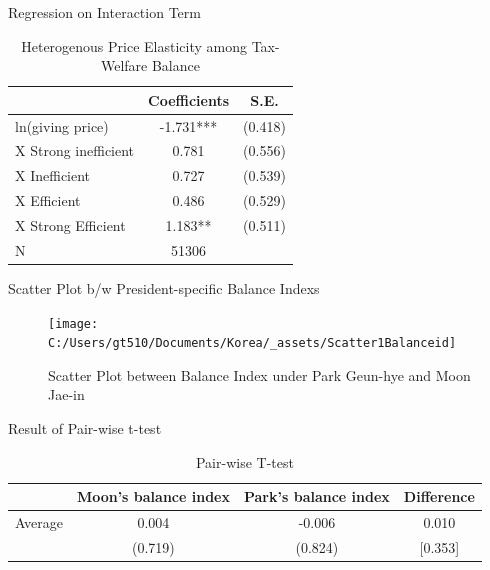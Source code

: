\documentclass[
  ignorenonframetext,
]{beamer}
\begin{document}
\begin{frame}{Regression on Interaction Term}
\protect\hypertarget{regression-on-interaction-term-1}{}

\begin{table}

\caption{\label{tab:kableEstimateInteractionByBalanceGroup}Heterogenous Price Elasticity among Tax-Welfare Balance}
\centering
\begin{tabular}[t]{lcc}
\toprule
 & Coefficients & S.E.\\
\midrule
ln(giving price) & -1.731*** & (0.418)\\
\hspace{1em}X Strong inefficient & 0.781 & (0.556)\\
\hspace{1em}X Inefficient & 0.727 & (0.539)\\
\hspace{1em}X Efficient & 0.486 & (0.529)\\
\hspace{1em}X Strong Efficient & 1.183** & (0.511)\\
N & 51306 & \\
\bottomrule
\end{tabular}
\end{table}

\end{frame}

\begin{frame}{Scatter Plot b/w President-specific Balance Indexs}
\protect\hypertarget{scatter-plot-bw-president-specific-balance-indexs}{}

\begin{figure}
\texttt{[image: C:/Users/gt510/Documents/Korea/\_assets/Scatter1Balanceid]} \caption{Scatter Plot between Balance Index under Park Geun-hye and Moon Jae-in}\label{fig:unnamed-chunk-11}
\end{figure}

\end{frame}

\begin{frame}{Result of Pair-wise t-test}
\protect\hypertarget{result-of-pair-wise-t-test-1}{}

\begin{table}

\caption{\label{tab:kableTtestPresidentBalanceid}Pair-wise T-test}
\centering
\fontsize{9}{11}\selectfont
\begin{tabular}[t]{lccc}
\toprule
 & Moon's balance index & Park's balance index & Difference\\
\midrule
Average & 0.004 & -0.006 & 0.010\\
 & (0.719) & (0.824) & [0.353]\\
\bottomrule
\end{tabular}
\end{table}

\end{frame}
\end{document}
